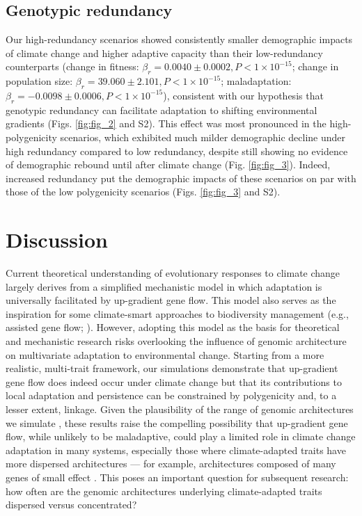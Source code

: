 \documentclass[9pt,twocolumn,twoside,lineno]{pnas-new}
\begin{document}
\subsection{Genotypic redundancy}
Our high-redundancy scenarios showed
consistently smaller demographic impacts of climate change and higher adaptive capacity
than their low-redundancy counterparts 
(change in fitness: $\beta_{r} = 0.0040\pm0.0002, P<1\times10^{-15}$;
change in population size: $\beta_{r} = 39.060\pm2.101, P<1\times10^{-15}$;
maladaptation: $\beta_{r} = -0.0098\pm0.0006, P<1\times10^{-15}$), consistent with our hypothesis that
genotypic redundancy can facilitate adaptation to shifting environmental gradients (Figs. \ref{fig:fig_2} and S2).
This effect was most pronounced in the high-polygenicity scenarios,
which exhibited much milder demographic decline under high redundancy compared to low redundancy,
despite still showing no evidence of demographic rebound until after climate change (Fig. \ref{fig:fig_3}).
Indeed, increased redundancy put the demographic
impacts of these scenarios on par with those
of the low polygenicity scenarios (Figs. \ref{fig:fig_3} and S2).


\section*{Discussion}

Current theoretical understanding of evolutionary responses to climate change
largely derives from a simplified mechanistic model in which
adaptation is universally facilitated by up-gradient gene flow.
This model also serves as the inspiration for some climate-smart
approaches to biodiversity management
(e.g., assisted gene flow; \cite{aitken_whitlock}).
However, adopting this model as the basis
for theoretical and mechanistic research
risks overlooking the influence of
genomic architecture on multivariate adaptation to environmental change.
Starting from a more realistic, multi-trait framework,
our simulations demonstrate that up-gradient gene flow does indeed
occur under climate change
but that its contributions to local adaptation and persistence can be constrained
by polygenicity and, to a lesser extent, linkage.
Given the plausibility of the range of genomic architectures we simulate
\cite{barghi_polygenic,boyle,rockman,savolainen,sella,bomblies},
these results raise the compelling
possibility that up-gradient gene flow, while unlikely
to be maladaptive, could play a limited role in
climate change adaptation in many systems,
especially those where climate-adapted traits
have more dispersed architectures --- for example, architectures composed of many genes of small effect \cite{yeaman_review}.
This poses an important question for subsequent research:
how often are the genomic architectures underlying climate-adapted traits dispersed
versus concentrated?
\end{document}
